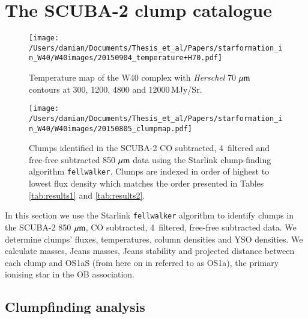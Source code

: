 


\section{The SCUBA-2 clump catalogue}


\begin{figure*}
\begin{center}
\texttt{[image: /Users/damian/Documents/Thesis\_et\_al/Papers/starformation\_in\_W40/W40images/20150904\_temperature+H70.pdf]}
\caption{Temperature map of the W40 complex with \emph{Herschel} 70\,$\,\mu\rm{m}$ contours at 300, 1200, 4800 and 12000\,MJy/Sr.}
\label{fig:temp}
\end{center}
\end{figure*}

\begin{figure}
\begin{center}
\texttt{[image: /Users/damian/Documents/Thesis\_et\_al/Papers/starformation\_in\_W40/W40images/20150805\_clumpmap.pdf]}
\caption{Clumps identified in the SCUBA-2 CO subtracted, 4\arcmin\ filtered and free-free subtracted 850\,$\,\mu\rm{m}$ data using the Starlink clump-finding algorithm \texttt{fellwalker}. Clumps are indexed in order of highest to lowest flux density which matches the order presented in Tables \ref{tab:results1} and \ref{tab:results2}.}
\label{fig:clumps}
\end{center}
\end{figure}


In this section we use the Starlink \texttt{fellwalker} algorithm to identify clumps in the SCUBA-2 850\,$\,\mu\rm{m}$, CO subtracted, 
4\arcmin\ filtered, free-free subtracted data. We determine clumps' fluxes, temperatures, column densities and YSO densities. 
We calculate masses, Jeans masses, Jeans stability and projected distance between each clump and OS1aS (from here on 
in referred to as OS1a), the primary ionising star in the OB association.  

\subsection{Clumpfinding analysis}

